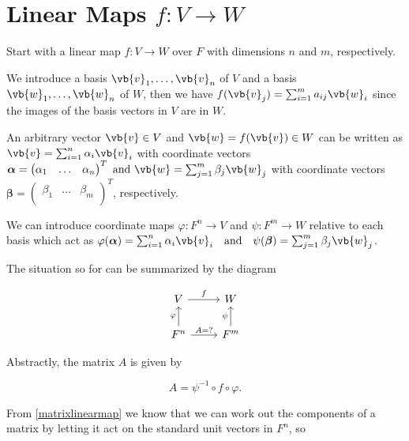 \documentclass[a4paper,12pt]{report}
\begin{document}
\section{Linear Maps \(f: V \rightarrow W\)}

Start with a linear map \(f:V \rightarrow W\) over \(F\) with dimensions \(n\) and \(m\), respectively. 

We introduce a basis \(\vb{v}_{1}, \ldots, \vb{v}_n \) of \(V\) and a basis \(\vb{w}_{1}, \ldots, \vb{w}_n \) of \(W\), then we have \(f(\vb{v} _{j} ) = \sum_{i=1}^{m} a_{ij} \vb{w} _{i} \) since the images of the basis vectors in \(V\) are in \(W\). 

An arbitrary vector \(\vb{v} \in  V\) and \(\vb{w} = f(\vb{v} ) \in  W\) can be written as \(\vb{v} = \sum_{i=1}^{n} \alpha _{i}\vb{v} _{i}  \) with coordinate vectors \(\boldsymbol{\alpha } = \begin{pmatrix}
    \alpha _{1}  & \ldots  & \alpha _{n}   \\
\end{pmatrix}^{T} \text { and } \vb{w} = \sum_{j=1}^{m} \beta _{j} \vb{w} _{j}   \) with coordinate vectors \(\boldsymbol{\beta } = \begin{pmatrix}
    \beta _{1}  & \ldots  & \beta _{m}   \\
\end{pmatrix}^{T} \), respectively. 

We can introduce coordinate maps \(\varphi : F^{n} \rightarrow V \) and \(\psi  :F^{m} \rightarrow W\) relative to each basis which act as \(\varphi (\boldsymbol{\alpha } ) = \sum_{i=1}^{n} \alpha _{i} \vb{v} _{i} \text {~~ and ~~} \psi (\boldsymbol{\beta } ) = \sum_{j=1}^{m} \beta _{j} \vb{w} _{j}\).


The situation so for can be summarized by the diagram

\begin{equation}
    \begin{tikzcd}
        V \arrow[r, "f"] & W \\
        F^n \arrow[u, "\varphi"] \arrow[r, "A{=}?"] & F^m \arrow[u, "\psi"]
    \end{tikzcd}
\end{equation}

Abstractly, the matrix \(A\) is given by  

\begin{equation}
    A = \psi ^{-1} \circ f \circ \varphi.
\end{equation}

From \cref{matrixlinearmap} we know that we can work out the components of a matrix by letting it act on the standard unit vectors in \(F^{n} \), so
\end{document}
